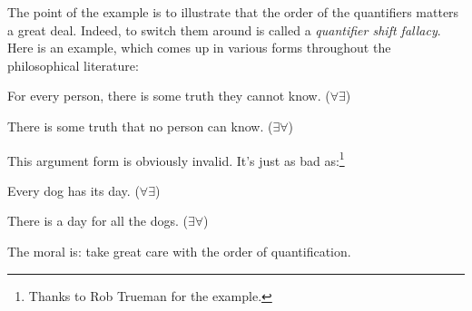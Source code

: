 The point of the example is to illustrate that the order of the quantifiers matters a great deal. Indeed, to switch them around is called a \emph{quantifier shift fallacy}. Here is an example, which comes up in various forms throughout the philosophical literature:
	\begin{earg}
		\item[] For every person, there is some truth they cannot know. \hfill ($\forall \exists$)
		\item[\therefore] There is some truth that no person can know. \hfill ($\exists \forall$)
	\end{earg}
This argument form is obviously invalid. It's just as bad as:\footnote{Thanks to Rob Trueman for the example.}
	\begin{earg}
		\item[] Every dog has its day. \hfill ($\forall \exists$)
		\item[\therefore] There is a day for all the dogs. \hfill ($\exists \forall$)
	\end{earg}

   

The moral is: take great care with the order of quantification.


